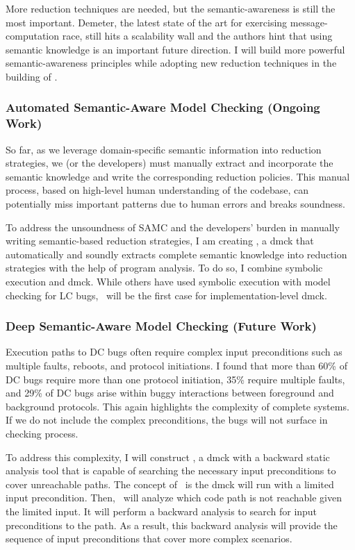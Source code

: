 \documentclass[11pt]{article}
\begin{document}
More reduction techniques are needed, but the semantic-awareness is still the
most important. Demeter, the latest state of the art for exercising
message-computation race, still hits a scalability wall and the authors hint
that using semantic knowledge is an important future direction. I will build
more powerful semantic-awareness principles while adopting new reduction
techniques in the building of \fullcheck.


\subsubsection{Automated Semantic-Aware Model Checking (Ongoing Work)} 

So far, as we leverage domain-specific semantic information into reduction
strategies, we (or the developers) must manually extract and incorporate the
semantic knowledge and write the corresponding reduction policies. This manual
process, based on high-level human understanding of the codebase, can
potentially miss important patterns due to human errors and breaks soundness.

To address the unsoundness of SAMC and the developers' burden in manually
writing semantic-based reduction strategies, I am creating \autocheck, a dmck
that automatically and soundly extracts complete semantic knowledge into
reduction strategies with the help of program analysis. To do so, I combine
symbolic execution and dmck. While others have used symbolic execution with
model checking for LC bugs, \autocheck\ will be the first case for
implementation-level dmck. 

\subsubsection{Deep Semantic-Aware Model Checking (Future Work)}

Execution paths to DC bugs often require complex input preconditions such as
multiple faults, reboots, and protocol initiations. I found that more than 60\%
of DC bugs require more than one protocol initiation, 35\% require multiple
faults, and 29\% of DC bugs arise within buggy interactions between foreground
and background protocols.  This again highlights the complexity of complete
systems. If we do not include the complex preconditions, the bugs will not
surface in checking process.

To address this complexity, I will construct \deepcheck, a dmck with a backward
static analysis tool that is capable of searching the necessary input
preconditions to cover unreachable paths. The concept of \deepcheck\ is the dmck
will run with a limited input precondition. Then, \deepcheck\ will analyze which
code path is not reachable given the limited input. It will perform a backward
analysis to search for input preconditions to the path. As a result, this
backward analysis will provide the sequence of input preconditions that cover
more complex scenarios.


\end{document}
